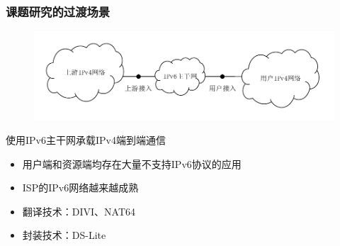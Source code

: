 \documentclass{beamer}
\begin{document}
\begin{frame}
  \frametitle{课题研究的过渡场景}

  \begin{figure}
    \includegraphics[width=\textwidth]{figs/1-464.pdf}
  \end{figure}
  \vspace{-1.5em}

  \begin{block}{使用IPv6主干网承载IPv4端到端通信}
    \begin{itemize}
    \item 用户端和资源端均存在大量不支持IPv6协议的应用
    \item ISP的IPv6网络越来越成熟
    \item 翻译技术：DIVI、NAT64
    \item 封装技术：DS-Lite
    \end{itemize}
  \end{block}
\end{frame}
\end{document}
